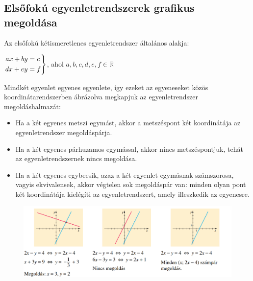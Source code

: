 \documentclass[12pt,a4paper]{article}
\newenvironment{rcases}
  {\left.\begin{aligned}}
  {\end{aligned}\right\rbrace}
\begin{document}
\subsection{Elsőfokú egyenletrendszerek grafikus megoldása}

Az elsőfokú kétismeretlenes egyenletrendszer általános alakja:

$\begin{rcases}ax+by&=c\\dx+ey&=f \end{rcases}$, ahol $a,b,c,d,e,f\in \mathbb{R}$

Mindkét egyenlet egyenes egyenlete, így ezeket az egyeneseket közös koordinátarendszerben ábrázolva megkapjuk az egyenletrendszer megoldáshalmazát:
\begin{itemize}
\item Ha a két egyenes metszi egymást, akkor a metszéspont két koordinátája az egyenletrendszer megoldáspárja.
\item Ha a két egyenes párhuzamos egymással, akkor nincs metszéspontjuk, tehát az egyenletrendszernek nincs megoldása.
\item Ha a két egyenes egybeesik, azaz a két egyenlet egymásnak számszorosa, vagyis ekvivalensek, akkor végtelen sok megoldáspár van: minden olyan pont két koordinátája kielégíti az egyenletrendszert, amely illeszkedik az egyenesre.
\end{itemize}

\begin{figure}[h!]
\centering
\includegraphics[width=\textwidth]{geometry/lin_egyenletrendszer}
\end{figure}
\end{document}
